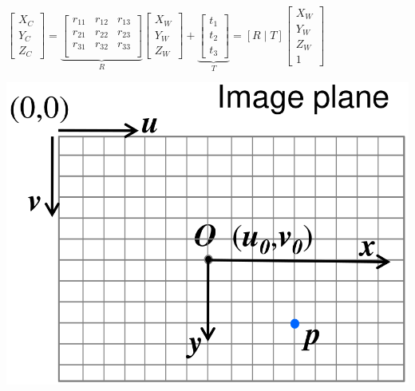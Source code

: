 \begin{itemize}
        $\begin{bmatrix}
            X_C\\
            Y_C\\
            Z_C
        \end{bmatrix}=
        \underbrace{
        \begin{bmatrix}
            r_{11}  & r_{12} & r_{13}\\
            r_{21}  & r_{22} & r_{23}\\
            r_{31}  & r_{32} & r_{33}\\
        \end{bmatrix}}_{R}
        \begin{bmatrix}
        X_W\\
        Y_W\\
        Z_W
        \end{bmatrix} +
        \underbrace{
        \begin{bmatrix}
            t_1\\
            t_2\\
            t_3
        \end{bmatrix}}_{T} = [R \mid T]
        \begin{bmatrix}
            X_W\\
            Y_W\\
            Z_W\\
            1
        \end{bmatrix}$
\end{itemize}
\begin{minipage}[b]{0.49\linewidth}
    \includegraphics[width=\linewidth]{./Figures/04_PerspectiveProjection1.png}
\end{minipage}
